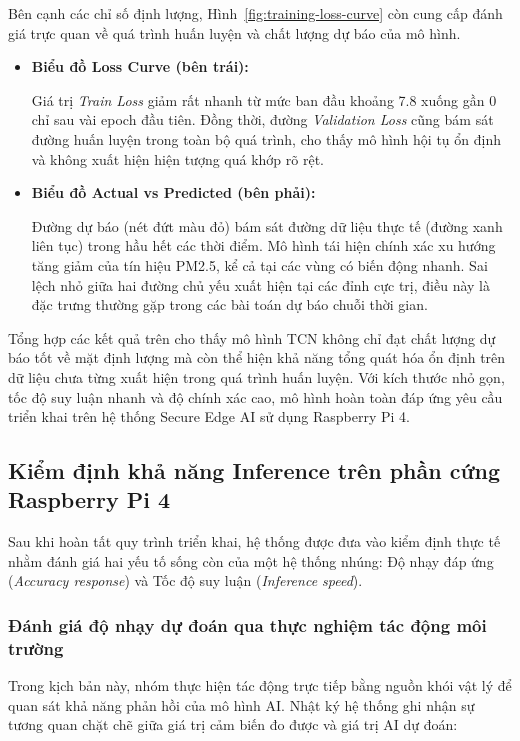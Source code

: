 Bên cạnh các chỉ số định lượng, Hình~\ref{fig:training-loss-curve} còn cung cấp đánh giá trực quan về quá trình huấn luyện và chất lượng dự báo của mô hình.

\begin{itemize}
    \item \textbf{Biểu đồ Loss Curve (bên trái):} 

    Giá trị \textit{Train Loss} giảm rất nhanh từ mức ban đầu khoảng 7.8 xuống gần 0 chỉ sau vài epoch đầu tiên. Đồng thời, đường \textit{Validation Loss} cũng bám sát đường huấn luyện trong toàn bộ quá trình, cho thấy mô hình hội tụ ổn định và không xuất hiện hiện tượng quá khớp rõ rệt.

    \item \textbf{Biểu đồ Actual vs Predicted (bên phải):}

    Đường dự báo (nét đứt màu đỏ) bám sát đường dữ liệu thực tế (đường xanh liên tục) trong hầu hết các thời điểm. Mô hình tái hiện chính xác xu hướng tăng giảm của tín hiệu PM2.5, kể cả tại các vùng có biến động nhanh. Sai lệch nhỏ giữa hai đường chủ yếu xuất hiện tại các đỉnh cực trị, điều này là đặc trưng thường gặp trong các bài toán dự báo chuỗi thời gian.
\end{itemize}

Tổng hợp các kết quả trên cho thấy mô hình TCN không chỉ đạt chất lượng dự báo tốt về mặt định lượng mà còn thể hiện khả năng tổng quát hóa ổn định trên dữ liệu chưa từng xuất hiện trong quá trình huấn luyện. Với kích thước nhỏ gọn, tốc độ suy luận nhanh và độ chính xác cao, mô hình hoàn toàn đáp ứng yêu cầu triển khai trên hệ thống Secure Edge AI sử dụng Raspberry Pi 4.

\subsection{Kiểm định khả năng Inference trên phần cứng Raspberry Pi 4}

Sau khi hoàn tất quy trình triển khai, hệ thống được đưa vào kiểm định thực tế nhằm đánh giá hai yếu tố sống còn của một hệ thống nhúng: Độ nhạy đáp ứng (\textit{Accuracy response}) và Tốc độ suy luận (\textit{Inference speed}).

\subsubsection{Đánh giá độ nhạy dự đoán qua thực nghiệm tác động môi trường}

Trong kịch bản này, nhóm thực hiện tác động trực tiếp bằng nguồn khói vật lý để quan sát khả năng phản hồi của mô hình AI. Nhật ký hệ thống ghi nhận sự tương quan chặt chẽ giữa giá trị cảm biến đo được và giá trị AI dự đoán:

